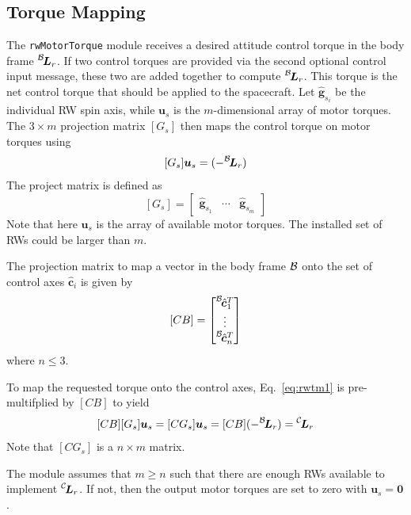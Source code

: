 \subsection{Torque Mapping}
The {\tt rwMotorTorque} module receives a desired attitude control torque in the body frame $\leftexp{B}{\bm L}_r$. If two control torques are provided via the second optional control input message, these two are added together to compute $\leftexp{B}{\bm L}_r$. This torque is the net control torque that should be applied to the spacecraft. Let $\hat{\bm g}_{s_{i}}$ be the individual RW spin axis, while $\bm u_{s}$ is the $m$-dimensional array of motor torques.  The $3\times m$ projection matrix $[G_{s}]$ then maps the control torque on motor torques using
\begin{equation}
	\label{eq:rwtm1}
	[G_{s}] \bm u_{s} = (-\leftexp{B}{\bm L}_r)
\end{equation}
The project matrix is defined as
\begin{equation}
	\label{eq:rwtm2}
	[G_{s}] = \begin{bmatrix}
		\hat{\bm g}_{s_{1}} & \cdots & \hat{\bm g}_{s_{m}}
	\end{bmatrix}
\end{equation}
Note that here $\bm u_{s}$ is the array of available motor torques.  The installed set of RWs could be larger than $m$.  

The projection matrix to map a vector in the body frame $\cal B$ onto the set of control axes $\hat{\bm c}_{i}$ is given by
\begin{equation}
	\label{eq:rwtm3}
	[CB] = \begin{bmatrix}
		\leftexp{B}{\hat{\bm c}}_{1}^{T}
		\\
		\vdots \\
		\leftexp{B}{\hat{\bm c}}_{n}^{T}
	\end{bmatrix}
\end{equation}
where $n \le 3$.  

To map the requested torque onto the control axes, Eq.~\eqref{eq:rwtm1} is pre-multifplied by $[CB]$ to yield
\begin{equation}
	\label{eq:rwtm4}
	[CB][G_{s}] \bm u_{s} = [CG_{s}] \bm u_{s} = [CB](-\leftexp{B}{\bm L}_r) = \leftexp{C}{\bm L}_{r}
\end{equation}
Note that $[CG_{s}]$ is a $n\times m$ matrix.  

The module assumes that $m\ge n$ such that there are enough RWs available to implement $ \leftexp{C}{\bm L}_{r}$.  If not, then the output motor torques are set to zero with $\bm u_{s} = \bm 0$.  

